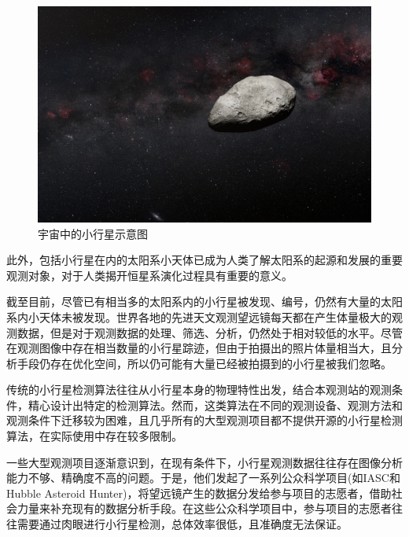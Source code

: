 \documentclass[12pt,a4paper]{article}%
\begin{document}
\begin{figure}[H]%
    \centering
    \begin{minipage}{0.83\textwidth}%
        \centering
        \includegraphics[width=1.0%
            \textwidth]{asteroid}%
        \caption{\fontsize{10pt}{15pt}\selectfont 宇宙中的小行星示意图}%
    \end{minipage}
\end{figure}

此外，包括小行星在内的太阳系小天体已成为人类了解太阳系的起源和发展的重要观测对象，对于人类揭开恒星系演化过程具有重要的意义。

截至目前，尽管已有相当多的太阳系内的小行星被发现、编号，仍然有大量的太阳系内小天体未被发现。世界各地的先进天文观测望远镜每天都在产生体量极大的观测数据，但是对于观测数据的处理、筛选、分析，仍然处于相对较低的水平。尽管在观测图像中存在相当数量的小行星踪迹，但由于拍摄出的照片体量相当大，且分析手段仍存在优化空间，所以仍可能有大量已经被拍摄到的小行星被我们忽略。

传统的小行星检测算法往往从小行星本身的物理特性出发，结合本观测站的观测条件，精心设计出特定的检测算法。然而，这类算法在不同的观测设备、观测方法和观测条件下迁移较为困难，且几乎所有的大型观测项目都不提供开源的小行星检测算法，在实际使用中存在较多限制。

一些大型观测项目逐渐意识到，在现有条件下，小行星观测数据往往存在图像分析能力不够、精确度不高的问题。于是，他们发起了一系列公众科学项目(如IASC和Hubble Asteroid Hunter)，将望远镜产生的数据分发给参与项目的志愿者，借助社会力量来补充现有的数据分析手段。在这些公众科学项目中，参与项目的志愿者往往需要通过肉眼进行小行星检测，总体效率很低，且准确度无法保证。
\end{document}
